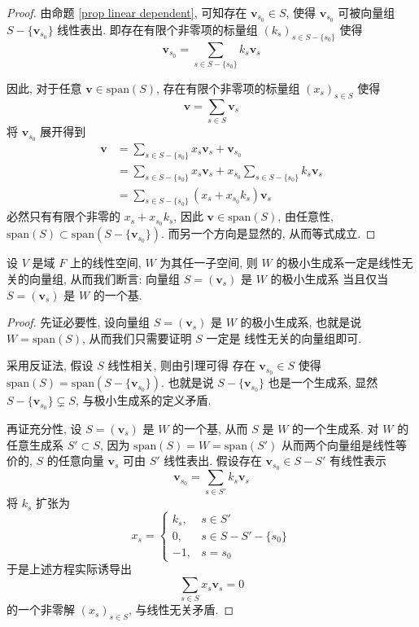 \documentclass[UTF8]{book}
\begin{document}
\begin{proof}
    由命题 \ref{prop linear dependent}, 
    可知存在 $\boldsymbol{v}_{s_0} \in S$, 
    使得 $\boldsymbol{v}_{s_0}$ 可被向量组 
    $S-\{\boldsymbol{v}_{s_0}\}$ 线性表出. 
    即存在有限个非零项的标量组 $(k_s)_{s \in S-\{s_0\}}$  使得 
    $$ \boldsymbol{v}_{s_0} = \sum_{s\in S-\{s_0\}} 
    k_s \boldsymbol{v}_s $$

    因此, 对于任意 $\boldsymbol{v} \in \mathrm{span}(S)$, 
    存在有限个非零项的标量组 $(x_s)_{s\in S}$ 使得 
    $$ \boldsymbol{v} = \sum_{s \in S} \boldsymbol{v}_s $$
    将 $\boldsymbol{v}_{s_0}$ 展开得到 
    $$ \begin{aligned}
    \boldsymbol{v} &= \sum_{s \in S-\{s_0\}}x_s
    \boldsymbol{v}_s + \boldsymbol{v}_{s_0}\\
    &=\sum_{s \in S-\{s_0\}}x_s 
    \boldsymbol{v}_s + x_{s_0}\sum_{s \in S-\{s_0\}}k_s\boldsymbol{v}_s \\
    &=\sum_{s \in S-\{s_0\}} (x_s + x_{s_0}k_s ) \boldsymbol{v}_s 
    \end{aligned} $$ 
    必然只有有限个非零的 $x_s + x_{s_0}k_s$, 因此 
    $\boldsymbol{v} \in \mathrm{span}(S)$, 
    由任意性, $\mathrm{span}(S) \subset
    \mathrm{span}(S-\{\boldsymbol{v}_{s_0}\})$. 
    而另一个方向是显然的, 从而等式成立. 
\end{proof}

\begin{theorem}
    设 $V$ 是域 $F$ 上的线性空间, $W$ 为其任一子空间, 
    则 $W$ 的极小生成系一定是线性无关的向量组, 
    从而我们断言: 
    向量组 $S=(\boldsymbol{v}_s)$ 是 $W$ 的极小生成系
    当且仅当 $S=(\boldsymbol{v}_s)$ 是 $W$ 的一个基. 
\end{theorem}

\begin{proof}
    先证必要性, 设向量组 $S=(\boldsymbol{v}_s)$ 是 $W$ 的极小生成系, 
    也就是说 $W = \mathrm{span}(S)$, 从而我们只需要证明 $S$ 一定是
    线性无关的向量组即可. 

    采用反证法, 假设 $S$ 线性相关, 则由引理可得 
    存在 $\boldsymbol{v}_{s_0} \in S$ 
    使得 $\mathrm{span}(S) =
    \mathrm{span}(S-\{\boldsymbol{v}_{s_0}\})$. 
    也就是说 $S-\{\boldsymbol{v}_{s_0}\}$ 也是一个生成系, 
    显然 $S-\{\boldsymbol{v}_{s_0}\} \subsetneq S$, 
    与极小生成系的定义矛盾. 

    再证充分性, 设 $S=(\boldsymbol{v}_s)$ 是 $W$ 的一个基, 
    从而 $S$ 是 $W$ 的一个生成系. 
    对 $W$ 的任意生成系 $S'\subset S$, 
    因为 $\mathrm{span}(S) = W = \mathrm{span}(S')$ 
    从而两个向量组是线性等价的, $S$ 的任意向量 $\boldsymbol{v}_s$ 
    可由 $S'$ 线性表出. 假设存在 
    $\boldsymbol{v}_{s_0} \in S - S'$ 
    有线性表示 
    $$\boldsymbol{v}_{s_0} = \sum_{s\in S'} k_s\boldsymbol{v}_s$$ 
    将 $k_s$ 扩张为 
    $$x_s = \begin{cases}
        k_s, & s \in S' \\
        0, & s \in S- S'-\{s_0\} \\
        -1, & s = s_0
    \end{cases}$$
    于是上述方程实际诱导出 $$\sum_{s\in S}x_s \boldsymbol{v}_s = 0$$ 
    的一个非零解 $(x_s)_{s\in S}$, 与线性无关矛盾. 
    
\end{proof}
\end{document}

